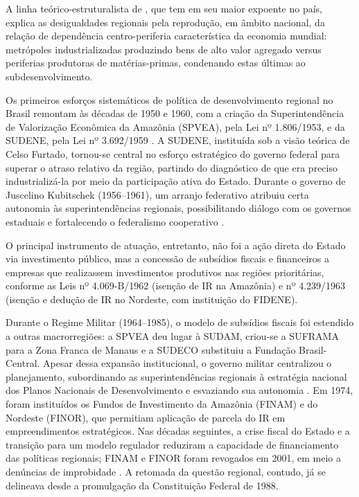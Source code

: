 A linha teórico-estruturalista de , que tem em  seu maior expoente no país, explica as desigualdades regionais pela reprodução, em âmbito nacional, da relação de dependência centro-periferia característica da economia mundial: metrópoles industrializadas produzindo bens de alto valor agregado versus periferias produtoras de matérias-primas, condenando estas últimas ao subdesenvolvimento.

Os primeiros esforços sistemáticos de política de desenvolvimento regional no Brasil remontam às décadas de 1950 e 1960, com a criação da Superintendência de Valorização Econômica da Amazônia (SPVEA), pela Lei nº 1.806/1953, e da SUDENE, pela Lei nº 3.692/1959 \cite{Silva2014,Portugal2020}. A SUDENE, instituída sob a visão teórica de Celso Furtado, tornou-se central no esforço estratégico do governo federal para superar o atraso relativo da região, partindo do diagnóstico de que era preciso industrializá-la por meio da participação ativa do Estado. Durante o governo de Juscelino Kubitschek (1956--1961), um arranjo federativo atribuiu certa autonomia às superintendências regionais, possibilitando diálogo com os governos estaduais e fortalecendo o federalismo cooperativo \cite{Bercovici2003}.

O principal instrumento de atuação, entretanto, não foi a ação direta do Estado via investimento público, mas a concessão de subsídios fiscais e financeiros a empresas que realizassem investimentos produtivos nas regiões prioritárias, conforme as Leis nº 4.069-B/1962 (isenção de IR na Amazônia) e nº 4.239/1963 (isenção e dedução de IR no Nordeste, com instituição do FIDENE).

Durante o Regime Militar (1964--1985), o modelo de subsídios fiscais foi estendido a outras macrorregiões: a SPVEA deu lugar à SUDAM, criou-se a SUFRAMA para a Zona Franca de Manaus e a SUDECO substituiu a Fundação Brasil-Central. Apesar dessa expansão institucional, o governo militar centralizou o planejamento, subordinando as superintendências regionais à estratégia nacional dos Planos Nacionais de Desenvolvimento e esvaziando sua autonomia \cite{Silva2014}. Em 1974, foram instituídos os Fundos de Investimento da Amazônia (FINAM) e do Nordeste (FINOR), que permitiam aplicação de parcela do IR em empreendimentos estratégicos. Nas décadas seguintes, a crise fiscal do Estado e a transição para um modelo regulador reduziram a capacidade de financiamento das políticas regionais; FINAM e FINOR foram revogados em 2001, em meio a denúncias de improbidade \cite{Portugal2024}. A retomada da questão regional, contudo, já se delineava desde a promulgação da Constituição Federal de 1988.

